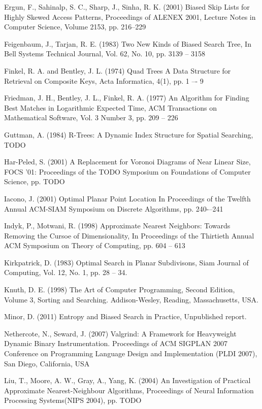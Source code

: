 \documentclass[mcs]{scsthesis}
\begin{document}
\begin{thebibliography}{5}
Ergun, F., Sahinalp, S. C., Sharp, J., Sinha, R. K. (2001) Biased Skip Lists
for Highly Skewed Access Patterns, Proceedings of ALENEX 2001, Lecture Notes in
Computer Science, Volume 2153, pp. 216--229 

Feigenbaum, J., Tarjan, R. E. (1983) Two New Kinds of Biased Search Tree,
In Bell Systems Technical Journal, Vol. 62, No. 10, pp. 3139 -- 3158

Finkel, R. A. and Bentley, J. L. (1974) Quad Trees A Data Structure for
Retrieval on Composite Keys, Acta Informatica, 4(1), pp. 1 –- 9 

Friedman, J. H., Bentley, J. L., Finkel, R. A. (1977) An Algorithm for Finding
Best Matches in Logarithmic Expected Time, ACM Transactions on Mathematical
Software, Vol. 3 Number 3, pp. 209 -- 226

Guttman, A. (1984) R-Trees: A Dynamic Index Structure for Spatial Searching,
TODO 

Har-Peled, S. (2001) A Replacement for Voronoi Diagrams of Near Linear Size, 
FOCS '01: Proceedings of the TODO Symposium on Foundations of Computer Science, 
pp. TODO

Iacono, J. (2001) Optimal Planar Point Location
In Proceedings of the Twelfth Annual ACM-SIAM Symposium on Discrete Algorithms,
pp. 240-–241

Indyk, P., Motwani, R. (1998) Approximate Nearest Neighbors: Towards Removing
the Cursoe of Dimensionality, In Proceedings of the Thirtieth Annual ACM
Symposium on Theory of Computing, pp. 604 -- 613 

Kirkpatrick, D. (1983) Optimal Search in Planar Subdivisons,
Siam Journal of Computing, Vol. 12, No. 1, pp. 28 -- 34.

Knuth, D. E. (1998) The Art of Computer Programming, Second Edition,
Volume 3, Sorting and Searching.  Addison-Wesley, Reading, Massachusetts, USA.

Minor, D. (2011) Entropy and Biased Search in Practice, Unpublished report.

Nethercote, N., Seward, J. (2007) Valgrind: A Framework for Heavyweight Dynamic
Binary Instrumentation.  Proceedings of ACM SIGPLAN 2007 Conference on
Programming Language Design and Implementation (PLDI 2007),
San Diego, California, USA 

Liu, T., Moore, A. W., Gray, A., Yang, K. (2004) An Investigation of Practical
Approximate Nearest-Neighbour Algorithms, Proceedings of Neural Information
Processing Systems(NIPS 2004), pp. TODO  


\end{thebibliography}
\end{document}
